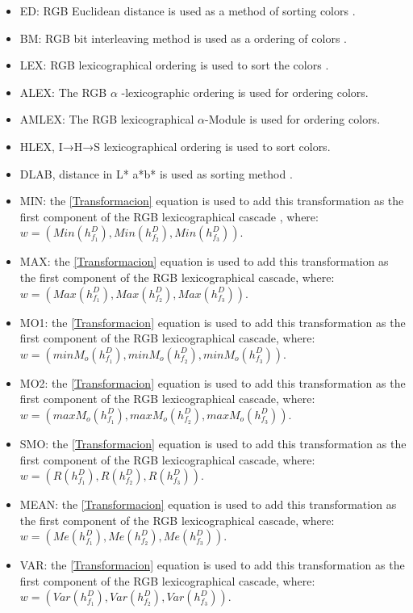 \begin{itemize}
	\item ED: RGB Euclidean distance is used as a method of sorting colors \cite{ortiz2002procesamiento}.
	\item BM: RGB bit interleaving method is used as a ordering of colors \cite{chanussot1997bit}.
	\item LEX: RGB lexicographical ordering is used to sort the colors .
	\item ALEX: The RGB  $\alpha$ -lexicographic ordering is used 
	\cite{zamora2001comparative} for ordering colors.
	\item AMLEX: The RGB lexicographical $\alpha$-Module is used \cite{angulo2003morphological} for ordering colors.
	\item HLEX,  I→H→S lexicographical ordering is used to sort colors.
	\item DLAB, distance in L* a*b* is used as sorting method \cite{ortiz2002procesamiento}.
	\item MIN: the \ref{Transformacion} equation is used to add this transformation as the first component of the RGB lexicographical cascade , where:\\ 
$w = (Min(h_{f_1}^D), Min(h_{f_2}^D),Min(h_{f_3}^D))$.
	\item MAX: the \ref{Transformacion} equation is used to add this transformation as the first component of the RGB lexicographical cascade, where:\\ 
$w = (Max(h_{f_1}^D), Max(h_{f_2}^D),Max(h_{f_3}^D))$.
	\item MO1: the \ref{Transformacion} equation is used to add this transformation as the first component of the RGB lexicographical cascade, where:\\ 
$w = (minM_o(h_{f_1}^D), minM_o(h_{f_2}^D), minM_o(h_{f_3}^D))$.
	\item MO2: the \ref{Transformacion} equation is used to add this transformation as the first component of the RGB lexicographical cascade, where:\\ 
$w = (maxM_o(h_{f_1}^D), maxM_o(h_{f_2}^D), maxM_o(h_{f_3}^D))$.
	\item SMO: the \ref{Transformacion} equation is used to add this transformation as the first component of the RGB lexicographical cascade, where:\\ 
$w = (R(h_{f_1}^D), R(h_{f_2}^D), R(h_{f_3}^D))$.
	\item MEAN: the \ref{Transformacion} equation is used to add this transformation as the first component of the RGB lexicographical cascade, where:\\ 
$w = (Me(h_{f_1}^D), Me(h_{f_2}^D), Me(h_{f_3}^D))$.
	\item VAR: the \ref{Transformacion} equation is used to add this transformation as the first component of the RGB lexicographical cascade, where:\\ 
$w = (Var(h_{f_1}^D), Var(h_{f_2}^D), Var(h_{f_3}^D))$.
\end{itemize}

